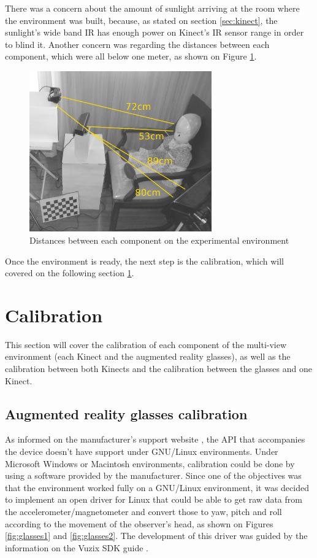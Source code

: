 \documentclass[msc, a4paper, classic, en]{ufbathesis}
\begin{document}
There was a concern about the amount of sunlight arriving at the room where the environment was built, because, as stated on section \ref{sec:kinect}, the sunlight's wide band IR has enough power on Kinect's IR sensor range in order to blind it. Another concern was regarding the distances between each component, which were all below one meter, as shown on Figure \ref{fig:expenv3}.

\begin{figure}
\centering
\includegraphics[width=0.7\textwidth]{images/expenv3.png}
\caption{Distances between each component on the experimental environment}
\label{fig:expenv3}
\end{figure}

Once the environment is ready, the next step is the calibration, which will covered on the following section \ref{sec:calibration}.

\section{Calibration}
\label{sec:calibration}

This section will cover the calibration of each component of the multi-view environment (each Kinect and the augmented reality glasses), as well as the calibration between both Kinects and the calibration between the glasses and one Kinect.

\subsection{Augmented reality glasses calibration}
\label{sec:glasses}

As informed on the manufacturer's support website \cite{vuzixsupport}, the API that accompanies the device doesn't have support under GNU/Linux environments. Under Microsoft Windows or Macintosh environments, calibration could be done by using a software provided by the manufacturer. Since one of the objectives was that the environment worked fully on a GNU/Linux environment, it was decided to implement an open driver for Linux that could be able to get raw data from the accelerometer/magnetometer and convert those to yaw, pitch and roll according to the movement of the observer's head, as shown on Figures \ref{fig:glasses1} and \ref{fig:glasses2}. The development of this driver was guided by the information on the Vuzix SDK guide \cite{vuzixsdk}.
\end{document}
